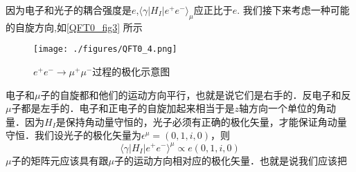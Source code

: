 因为电子和光子的耦合强度是$e$,$\langle \gamma | H_I | e^+ e^- \rangle_\mu$应正比于$e$. 我们接下来考虑一种可能的自旋方向,如\autoref{QFT0_fig3} 所示
\begin{figure}[ht]
\centering
\texttt{[image: ./figures/QFT0\_4.png]}
\caption{$e^+e^-\rightarrow\mu^+\mu^-$过程的极化示意图} \label{QFT0_fig4}
\end{figure}
电子和$\mu$子的自旋都和他们的运动方向平行，也就是说它们是右手的．反电子和反$\mu$子都是左手的．电子和正电子的自旋加起来相当于是$z$轴方向一个单位的角动量．因为$H_I$是保持角动量守恒的，光子必须有正确的极化矢量，才能保证角动量守恒．我们设光子的极化矢量为$\epsilon^\mu =(0,1,i,0)$，则
\begin{equation}
\langle \gamma | H_I | e^+ e^- \rangle^\mu \propto e (0,1,i ,0)
\end{equation}
$\mu$子的矩阵元应该具有跟$\mu$子的运动方向相对应的极化矢量．也就是说我们应该把



























